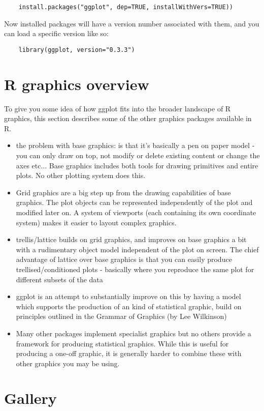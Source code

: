\begin{verbatim}
	install.packages("ggplot", dep=TRUE, installWithVers=TRUE))
\end{verbatim}

Now installed packages will have a version number associated with them, and you can load a specific version like so:

\begin{verbatim}
	library(ggplot, version="0.3.3")
\end{verbatim}


\section{R graphics overview}

To give you some idea of how ggplot fits into the broader landscape of R graphics, this section describes some of the other graphics packages available in R.

\begin{itemize} 
	\item the problem with base graphics: is that it's basically a pen on paper model - you can only draw on top, not modify or delete existing content or change the axes etc... Base graphics includes both tools for drawing primitives and entire plots. No other plotting system does this.

	\item Grid graphics are a big step up from the drawing capabilities of base graphics. The plot objects can be represented independently of the plot and modified later on. A system of viewports (each containing its own coordinate system) makes it easier to layout complex graphics.

	\item trellis/lattice builds on grid graphics, and improves on base graphics a bit with a rudimentary object model independent of the plot on screen. The chief advantage of lattice over base graphics is that you can easily produce trellised/conditioned plots - basically where you reproduce the same plot for different subsets of the data

	\item ggplot is an attempt to substantially improve on this by having a model which supports the production of an kind of statistical graphic, build on principles outlined in the Grammar of Graphics (by Lee Wilkinson)

	\item Many other packages implement specialist graphics but no others provide a framework for producing statistical graphics. While this is useful for producing a one-off graphic, it is generally harder to combine these with other graphics you may be using.

\end{itemize}

\section{Gallery}


